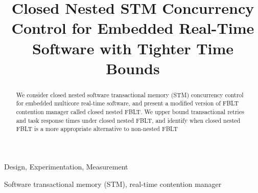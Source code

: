 \documentclass[letter]{sig-alternate}
\begin{document}
\begin{comment}
\conferenceinfo{DAC 2012,} {June 3-7, 2012, San Francisco, California, USA.}
\CopyrightYear{2012}
\crdata{978-1-4503-1199-1/12/06}
\end{comment}


\title{Closed Nested STM Concurrency Control for Embedded Real-Time Software with Tighter Time Bounds}


\begin{comment}
\author{
\alignauthor Mohammed El-Shambakey\\
\affaddr{ECE Dept., Virginia Tech}\\
\affaddr{Blacksburg, VA 24060, USA}\\
\email{shambake@vt.edu}
\alignauthor Binoy Ravindran\\
\affaddr{ECE Dept., Virginia Tech}\\
\affaddr{Blacksburg, VA 24060, USA}\\
\email{binoy@vt.edu}
}
\end{comment}

\maketitle

\begin{abstract}
We consider closed nested software transactional memory (STM) concurrency control for embedded multicore real-time software, and present a modified version of FBLT contention manager called closed nested FBLT. We upper bound transactional retries and task response times under closed nested FBLT, and identify when closed nested FBLT is a more appropriate alternative to non-nested FBLT
\end{abstract}


\terms
Design, Experimentation, Measurement

\keywords
Software transactional memory (STM), real-time contention manager

\end{document}
